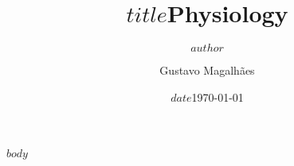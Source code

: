 \documentclass[twocolumn]{article}
\author{$author$}
\author{Gustavo Magalhães}
\title{$title$}
\title{Physiology}
\date{$date$}
\date{\today}
\begin{document}
\maketitle

$body$

\newpage
\onecolumn

\printbibliography
\end{document}
